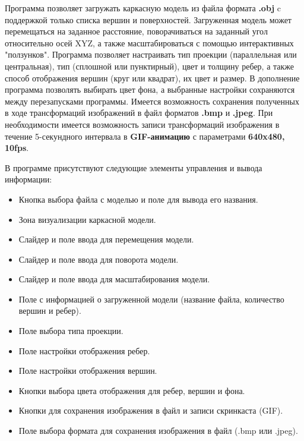 \documentclass[12pt, a4paper]{article}
\begin{document}
Программа позволяет загружать каркасную модель из файла формата \textbf{.obj} c поддержкой только списка вершин и поверхностей.
Загруженная модель может перемещаться на заданное расстояние, поворачиваться на заданный угол относительно осей XYZ, а также масштабироваться с помощью интерактивных "ползунков".
Программа позволяет настраивать тип проекции (параллельная или центральная), тип (сплошной или пунктирный), цвет и толщину ребер, а также способ отображения вершин (круг или квадрат), их цвет и размер.
В дополнение программа позволять выбирать цвет фона, а выбранные настройки сохраняются между перезапусками программы. Имеется возможность сохранения полученных в ходе трансформаций изображений в файл форматов \textbf{.bmp} и \textbf{.jpeg}.
При необходимости имеется возможность записи трансформаций изображения в течение 5-секундного интервала в \textbf{GIF-анимацию} с параметрами \textbf{640x480, 10fps}.

В программе присутствуют следующие элементы управления и вывода информации:
\begin{itemize}
    \item Кнопка выбора файла с моделью и поле для вывода его названия.
    \item Зона визуализации каркасной модели.
    \item Слайдер и поле ввода для перемещения модели.
    \item Слайдер и поле ввода для поворота модели.
    \item Слайдер и поле ввода для масштабирования модели.
    \item Поле с информацией о загруженной модели (название файла, количество вершин и ребер).
    \item Поле выбора типа проекции.
    \item Поле настройки отображения ребер.
    \item Поле настройки отображения вершин.
    \item Кнопки выбора цвета отображения для ребер, вершин и фона.
    \item Кнопки для сохранения изображения в файл и записи скринкаста (GIF).
    \item Поле выбора формата для сохранения изображения в файл (.bmp или .jpeg).
\end{itemize}
\end{document}
